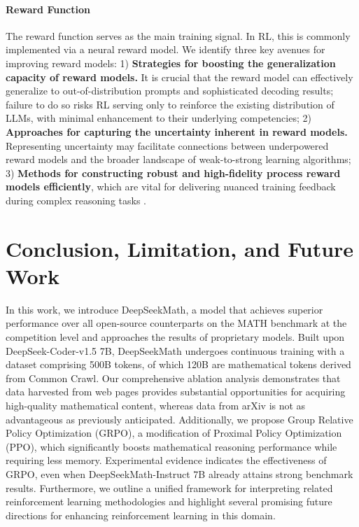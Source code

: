 \begin{itemize}[topsep=0pt]
\paragraph{Reward Function} The reward function serves as the main training signal. In RL, this is commonly implemented via a neural reward model. We identify three key avenues for improving reward models: 1) \textbf{Strategies for boosting the generalization capacity of reward models.} It is crucial that the reward model can effectively generalize to out-of-distribution prompts and sophisticated decoding results; failure to do so risks RL serving only to reinforce the existing distribution of LLMs, with minimal enhancement to their underlying competencies; 2) \textbf{Approaches for capturing the uncertainty inherent in reward models.} Representing uncertainty may facilitate connections between underpowered reward models and the broader landscape of weak-to-strong learning algorithms; 3) \textbf{Methods for constructing robust and high-fidelity process reward models efficiently}, which are vital for delivering nuanced training feedback during complex reasoning tasks \citep{lightman2023let,wang2023math}.

\section{Conclusion, Limitation, and Future Work} 
In this work, we introduce DeepSeekMath, a model that achieves superior performance over all open-source counterparts on the MATH benchmark at the competition level and approaches the results of proprietary models. Built upon DeepSeek-Coder-v1.5 7B, DeepSeekMath undergoes continuous training with a dataset comprising 500B tokens, of which 120B are mathematical tokens derived from Common Crawl. Our comprehensive ablation analysis demonstrates that data harvested from web pages provides substantial opportunities for acquiring high-quality mathematical content, whereas data from arXiv is not as advantageous as previously anticipated. Additionally, we propose Group Relative Policy Optimization (GRPO), a modification of Proximal Policy Optimization (PPO), which significantly boosts mathematical reasoning performance while requiring less memory. Experimental evidence indicates the effectiveness of GRPO, even when DeepSeekMath-Instruct 7B already attains strong benchmark results. Furthermore, we outline a unified framework for interpreting related reinforcement learning methodologies and highlight several promising future directions for enhancing reinforcement learning in this domain.


\end{itemize}
